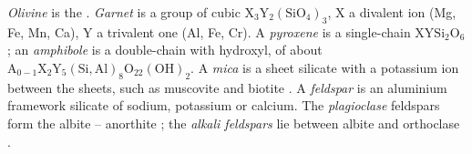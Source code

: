 \begin{definition}\label{def:b1:rock-forming-minerals:groups}
\emph{Olivine} is the  
. \emph{Garnet} is a group of cubic
 $\mathrm{X_3Y_2(SiO_4)_3}$, X a divalent ion (Mg, Fe, Mn, Ca),
Y a trivalent one (Al, Fe, Cr). A \emph{pyroxene} is a
single-chain  $\mathrm{XYSi_2O_6}$; an
\emph{amphibole} is a double-chain  with
hydroxyl, of about $\mathrm{A_{0-1}X_2Y_5(Si,Al)_8O_{22}(OH)_2}$. A
\emph{mica} is a sheet silicate with a potassium ion between
the sheets, such as muscovite  and biotite
. A \emph{feldspar} is an
aluminium framework silicate of sodium, potassium or calcium. The
\emph{plagioclase} feldspars form the 
albite  -- anorthite ; the \emph{alkali
feldspars} lie between albite and
orthoclase .
\end{definition}

